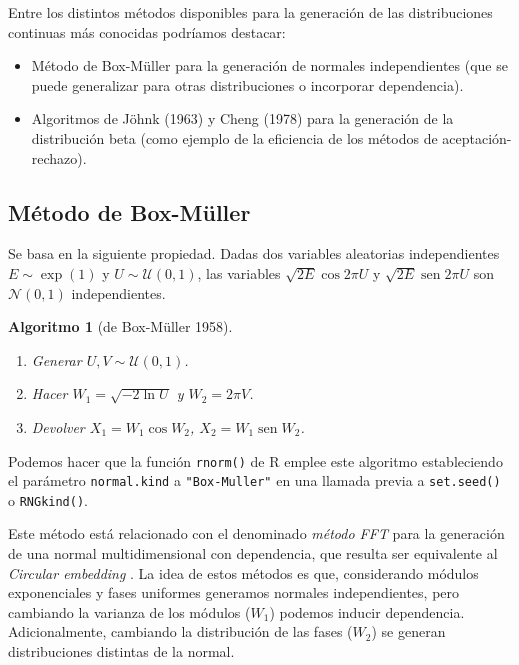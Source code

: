 \documentclass[
  10pt,
]{book}
\theoremstyle{break}
\newtheorem{conjecture}{Algoritmo}[chapter]
\theoremstyle{nonumberplain}
\begin{document}
Entre los distintos métodos disponibles para la generación de las distribuciones continuas más conocidas podríamos destacar:

\begin{itemize}
\item
  Método de Box-Müller para la generación de normales independientes (que se puede generalizar para otras distribuciones o incorporar dependencia).
\item
  Algoritmos de Jöhnk (1963) y Cheng (1978) para la generación de la distribución beta (como ejemplo de la eficiencia de los métodos de aceptación-rechazo).
\end{itemize}

\hypertarget{muxe9todo-de-box-muxfcller}{%
\subsection{Método de Box-Müller}\label{muxe9todo-de-box-muxfcller}}

Se basa en la siguiente propiedad. Dadas dos variables aleatorias independientes \(E \sim \exp\left( 1\right)\) y
\(U \sim \mathcal{U}( 0, 1 )\), las variables
\(\sqrt{2E} \cos 2\pi U\) y \(\sqrt{2E}\operatorname{sen} 2\pi U\) son
\(\mathcal{N}( 0, 1 )\) independientes.

\begin{conjecture}[de Box-Müller 1958]
\protect\hypertarget{cnj:box-muller}{}\label{cnj:box-muller}

\begin{enumerate}
\def\labelenumi{\arabic{enumi}.}
\item
  Generar \(U,V\sim \mathcal{U}(0, 1)\).
\item
  Hacer \(W_1=\sqrt{-2\ln U}\) y \(W_2=2\pi V\).
\item
  Devolver \(X_1=W_1\cos W_2\), \(X_2=W_1\operatorname{sen}W_2\).
\end{enumerate}

\end{conjecture}

Podemos hacer que la función \texttt{rnorm()} de R emplee este algoritmo estableciendo el parámetro \texttt{normal.kind} a \texttt{"Box-Muller"} en una llamada previa a \texttt{set.seed()} o \texttt{RNGkind()}.

Este método está relacionado con el denominado \emph{método FFT} \citep[transformada rápida de Fourier, e.g.][]{davies1987} para la generación de una normal multidimensional con dependencia, que resulta ser equivalente al \emph{Circular embedding} \citep{dietrich1997}.
La idea de estos métodos es que, considerando módulos exponenciales y fases uniformes generamos normales independientes, pero cambiando la varianza de los módulos (\(W_1\)) podemos inducir dependencia.
Adicionalmente, cambiando la distribución de las fases (\(W_2\)) se generan distribuciones distintas de la normal.
\end{document}
